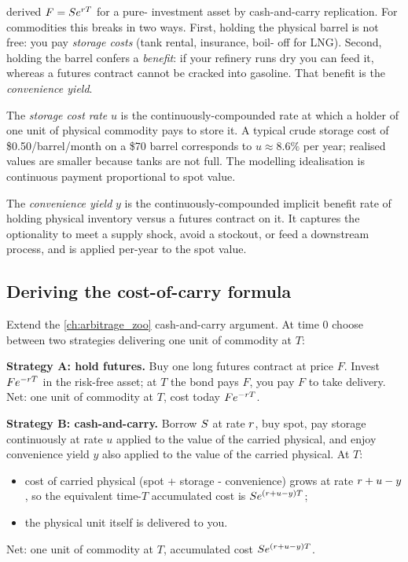  derived $F = S e^{r T}$ for a pure-
investment asset by cash-and-carry replication.  For commodities
this breaks in two ways.  First, holding the physical barrel is not
free: you pay \emph{storage costs} (tank rental, insurance, boil-
off for LNG).  Second, holding the barrel confers a \emph{benefit}:
if your refinery runs dry you can feed it, whereas a futures
contract cannot be cracked into gasoline.  That benefit is the
\emph{convenience yield}.

\begin{definition}
The \emph{storage cost rate} $u$ is the continuously-compounded
rate at which a holder of one unit of physical commodity pays to
store it.  A typical crude storage cost of \$0.50/barrel/month on a
\$70 barrel corresponds to $u \approx 8.6\%$ per year; realised
values are smaller because tanks are not full.  The modelling
idealisation is continuous payment proportional to spot value.
\end{definition}

\begin{definition}
The \emph{convenience yield} $y$ is the continuously-compounded
implicit benefit rate of holding physical inventory versus a
futures contract on it.  It captures the optionality to meet a
supply shock, avoid a stockout, or feed a downstream process, and
is applied per-year to the spot value.
\end{definition}

\subsection{Deriving the cost-of-carry formula}

Extend the \cref{ch:arbitrage_zoo} cash-and-carry argument.  At time
0 choose between two strategies delivering one unit of commodity at
$T$:

\medskip
\noindent\textbf{Strategy A: hold futures.} Buy one long futures
contract at price $F$.  Invest $F e^{-r T}$ in the risk-free
asset; at $T$ the bond pays $F$, you pay $F$ to take delivery.
Net: one unit of commodity at $T$, cost today $F e^{-r T}$.

\medskip
\noindent\textbf{Strategy B: cash-and-carry.} Borrow $S$ at rate
$r$, buy spot, pay storage continuously at rate $u$ applied to
the value of the carried physical, and enjoy convenience yield $y$
also applied to the value of the carried physical.  At $T$:
\begin{itemize}
  \item cost of carried physical (spot + storage - convenience)
    grows at rate $r + u - y$, so the equivalent time-$T$
    accumulated cost is $S e^{(r+u-y)T}$;
  \item the physical unit itself is delivered to you.
\end{itemize}
Net: one unit of commodity at $T$, accumulated cost
$S e^{(r+u-y)T}$.

